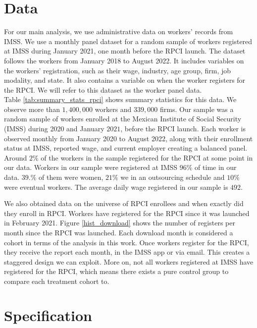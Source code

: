 \documentclass[oneside,11pt]{article}
\begin{document}
\section{Data} \label{data}


For our main analysis, we use administrative data on workers' records from IMSS. We use a monthly panel dataset for a random sample of workers registered at IMSS during January 2021, one month before the RPCI launch. The dataset follows the workers from January 2018 to August 2022. It includes variables on the workers' registration, such as their wage, industry, age group, firm, job modality, and state. It also contains a variable on when the worker registers for the RPCI. We will refer to this dataset as the worker panel data. \\ 

Table \ref{tab:summary_stats_rpci} shows summary statistics for this data. We observe more than $1,400,000$ workers and $339,000$ firms. Our sample was a random sample of workers enrolled at the Mexican Institute of Social Security (IMSS) during 2020 and January $2021$, before the RPCI launch. Each worker is observed monthly from January 2020 to August 2022, along with their enrollment status at IMSS, reported wage, and current employer creating a balanced panel. Around $2\%$ of the workers in the sample registered for the RPCI at some point in our data. Workers in our sample were registered at IMSS $96\%$ of time in our data. $39.\%$ of them were women, $21\%$ we in an outsourcing schedule and $10\%$ were eventual workers. The average daily wage registered in our sample is $492$. 

We also obtained data on the universe of RPCI enrollees and when exactly did they enroll in RPCI.  Workers have registered for the RPCI since it was launched in February 2021. Figure \ref{hist_download} shows the number of registers per month since the RPCI was launched. Each download month is considered a cohort in terms of the analysis in this work. Once workers register for the RPCI, they receive the report each month, in the IMSS app or via email. This creates a staggered design we can exploit. More on, not all workers registered at IMSS have registered for the RPCI, which means there exists a pure control group to compare each treatment cohort to. 



\section{Specification} \label{specification}
\end{document}
